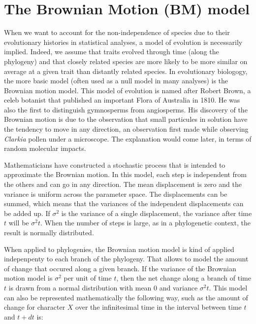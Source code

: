 \documentclass[
]{book}
\begin{document}
\hypertarget{BM-model}{%
\chapter{The Brownian Motion (BM) model}\label{BM-model}}

When we want to account for the non-independence of species due to their evolutionary histories in statistical analyses, a model of evolution is necessarily implied. Indeed, we assume that traits evolved through time (along the phylogeny) and that closely related species are more likely to be more similar on average at a given trait than distantly related species. In evolutionary biologogy, the more basic model (often used as a null model in many analyses) is the Brownian motion model. This model of evolution is named after Robert Brown, a celeb botanist that published an important Flora of Australia in 1810. He was also the first to distinguish gymnosperms from angiosperms. His discovery of the Brownian motion is due to the observation that small particules in solution have the tendency to move in any direction, an observation first made while observing \emph{Clarkia} pollen under a microscope. The explanation would come later, in terms of random molecular impacts.

Mathematicians have constructed a stochastic process that is intended to approximate the Brownian motion. In this model, each step is independent from the others and can go in any direction. The mean displacement is zero and the variance is uniform across the parameter space. The displacements can be summed, which means that the variances of the independent displacements can be added up. If \(\sigma^2\) is the variance of a single displacement, the variance after time \(t\) will be \(\sigma^2t\). When the number of steps is large, as in a phylogenetic context, the result is normally distributed.

When applied to phylogenies, the Brownian motion model is kind of applied indepenpenty to each branch of the phylogeny. That allows to model the amount of change that occured along a given branch. If the variance of the Brownian motion model is \(\sigma^2\) per unit of time \(t\), then the net change along a branch of time \(t\) is drawn from a normal distribution with mean \(0\) and variance \(\sigma^2t\). This model can also be represented mathematically the following way, such as the amount of change for character \(X\) over the infinitesimal time in the interval between time \(t\) and \(t+dt\) is:
\end{document}
